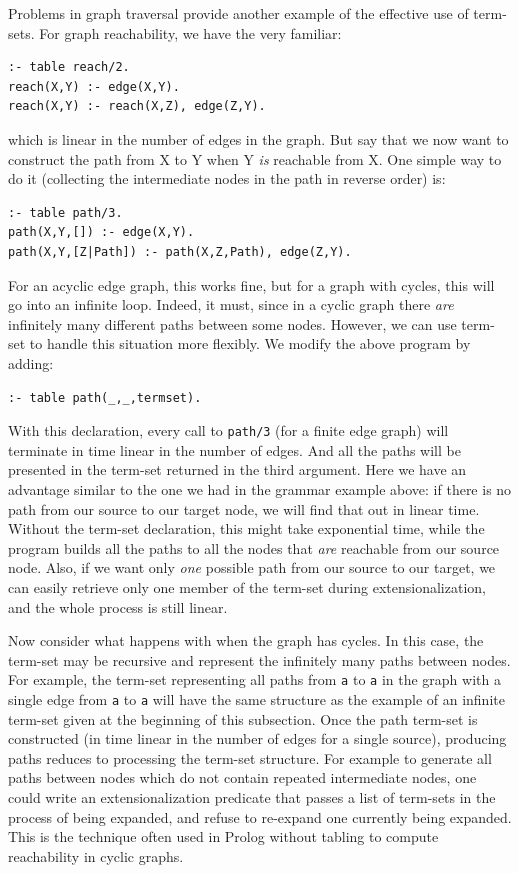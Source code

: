 Problems in graph traversal provide another example of the effective
use of term-sets.  For graph reachability, we have the very familiar:
\begin{verbatim}
:- table reach/2.
reach(X,Y) :- edge(X,Y).
reach(X,Y) :- reach(X,Z), edge(Z,Y).
\end{verbatim}
which is linear in the number of edges in the graph.  But say that we
now want to construct the path from X to Y when Y \emph{is} reachable
from X.  One simple way to do it (collecting the intermediate nodes in
the path in reverse order) is:
\begin{verbatim}
:- table path/3.
path(X,Y,[]) :- edge(X,Y).
path(X,Y,[Z|Path]) :- path(X,Z,Path), edge(Z,Y).
\end{verbatim}
For an acyclic edge graph, this works fine, but for a graph with
cycles, this will go into an infinite loop.  Indeed, it must, since in
a cyclic graph there \emph{are} infinitely many different paths between
some nodes.  However, we can use term-set to handle this situation
more flexibly.  We modify the above program by adding:
\begin{verbatim}
:- table path(_,_,termset).
\end{verbatim}
With this declaration, every call to {\tt path/3} (for a finite edge
graph) will terminate in time linear in the number of edges.  And all
the paths will be presented in the term-set returned in the third
argument.  Here we have an advantage similar to the one we had in the
grammar example above: if there is no path from our source to our
target node, we will find that out in linear time.  Without the
term-set declaration, this might take exponential time, while the
program builds all the paths to all the nodes that \emph{are} reachable
from our source node.  Also, if we want only \emph{one} possible path
from our source to our target, we can easily retrieve only one member
of the term-set during extensionalization, and the whole process is
still linear.

Now consider what happens with when the graph has cycles.  In this
case, the term-set may be recursive and represent the infinitely many
paths between nodes.  For example, the term-set representing all paths
from {\tt a} to {\tt a} in the graph with a single edge from {\tt a} to
{\tt a} will have the same structure as the example of an infinite
term-set given at the beginning of this subsection.  Once the path
term-set is constructed (in time linear in the number of edges for a
single source), producing paths reduces to processing the term-set
structure.  For example to generate all paths between nodes which do
not contain repeated intermediate nodes, one could write an
extensionalization predicate that passes a list of term-sets in the
process of being expanded, and refuse to re-expand one currently being
expanded.  This is the technique often used in Prolog without tabling
to compute reachability in cyclic graphs.

